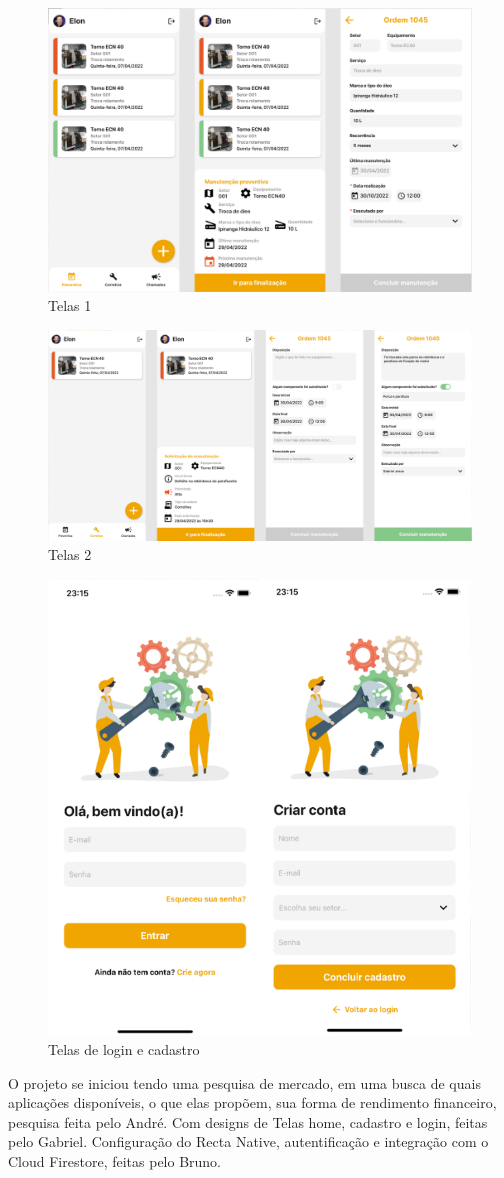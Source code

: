 \documentclass[%
  a4paper,%
  12pt,%
  english,%
  brazilian,%
]{article}
\begin{document}
\begin{figure}[!h]
  \includegraphics[width = 0.6\linewidth]{Figures/t1.PNG}
  \caption{Telas 1}
  \end{figure}
  
  \begin{figure}[!h]
  \includegraphics[width = 0.6\linewidth]{Figures/t2.PNG}
  \caption{Telas 2}
  \end{figure}
  
  \begin{figure}[!h]
  \includegraphics[width = 0.35\linewidth]{Figures/t3.PNG}
  \caption{Telas de login e cadastro}
  \end{figure}


O projeto se iniciou tendo uma pesquisa de mercado, em uma busca de quais aplicações disponíveis, o que elas propõem, sua forma de rendimento financeiro, pesquisa feita pelo André. Com designs de Telas home, cadastro e login, feitas pelo Gabriel. Configuração do Recta Native, autentificação e integração com o Cloud Firestore, feitas pelo Bruno.
\end{document}
